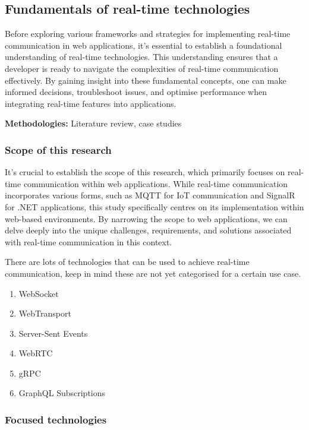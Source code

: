 \subsection{Fundamentals of real-time technologies}

Before exploring various frameworks and strategies for implementing real-time communication in web applications, it's essential to establish a foundational understanding of real-time technologies. This understanding ensures that a developer is ready to navigate the complexities of real-time communication effectively. By gaining insight into these fundamental concepts, one can make informed decisions, troubleshoot issues, and optimise performance when integrating real-time features into applications.

\textbf{Methodologies:} Literature review, case studies

\subsubsection{Scope of this research}

It's crucial to establish the scope of this research, which primarily focuses on real-time communication within web applications. While real-time communication incorporates various forms, such as MQTT for IoT communication and SignalR for .NET applications, this study specifically centres on its implementation within web-based environments. By narrowing the scope to web applications, we can delve deeply into the unique challenges, requirements, and solutions associated with real-time communication in this context.

There are lots of technologies \cite{alby-ws-alt} that can be used to achieve real-time communication, keep in mind these are not yet categorised for a certain use case.

\begin{enumerate}
  \item WebSocket
  \item WebTransport
  \item Server-Sent Events
  \item WebRTC
  \item gRPC
  \item GraphQL Subscriptions
\end{enumerate}

\subsubsection{Focused technologies}

